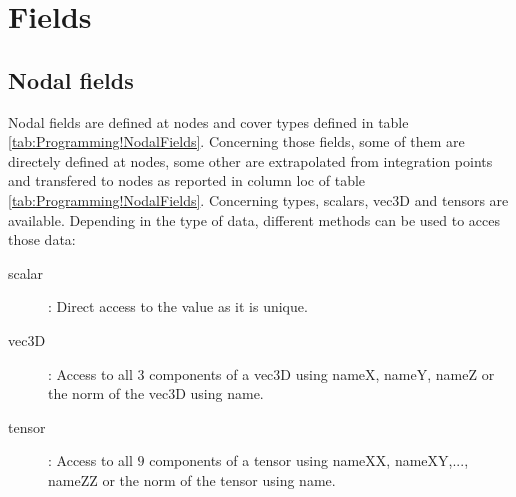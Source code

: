 \section{Fields}

\subsection{Nodal fields}

Nodal fields are defined at nodes and cover types defined in table
\ref{tab:Programming!NodalFields}. Concerning those fields, some
of them are directely defined at nodes, some other are extrapolated
from integration points and transfered to nodes as reported in column
\textsf{loc} of table \ref{tab:Programming!NodalFields}. Concerning
types, \textsf{scalars}, \textsf{vec3D} and \textsf{tensors} are available.
Depending in the type of data, different methods can be used to acces
those data:
\begin{description}
\item [{scalar}] : Direct access to the value as it is unique.
\item [{vec3D}] : Access to all $3$ components of a vec3D using \textsf{nameX},
\textsf{nameY}, \textsf{nameZ} or the norm of the vec3D using \textsf{name}.
\item [{tensor}] : Access to all $9$ components of a tensor using \textsf{nameXX},
\textsf{nameXY},..., \textsf{nameZZ} or the norm of the tensor using
\textsf{name}.
\end{description}
